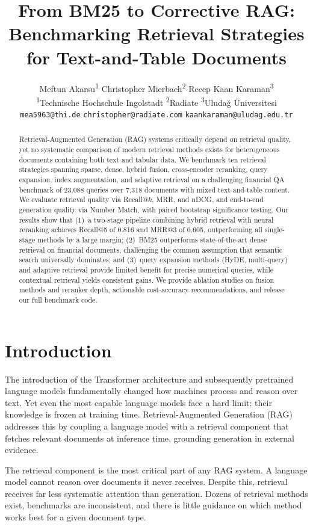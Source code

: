 \documentclass[11pt]{article}
\title{From BM25 to Corrective RAG: Benchmarking Retrieval Strategies for Text-and-Table Documents}
\author{
  Meftun Akarsu\textsuperscript{1} \quad
  Christopher Mierbach\textsuperscript{2} \quad
  Recep Kaan Karaman\textsuperscript{3} \\[6pt]
  \textsuperscript{1}Technische Hochschule Ingolstadt \quad
  \textsuperscript{2}Radiate \quad
  \textsuperscript{3}Uludağ Üniversitesi \\[2pt]
  \texttt{mea5963@thi.de} \quad
  \texttt{christopher@radiate.com} \quad
  \texttt{kaankaraman@uludag.edu.tr}
}
\begin{document}
\maketitle

\begin{abstract}
Retrieval-Augmented Generation (RAG) systems critically depend on retrieval quality, yet no systematic comparison of modern retrieval methods exists for heterogeneous documents containing both text and tabular data. We benchmark ten retrieval strategies spanning sparse, dense, hybrid fusion, cross-encoder reranking, query expansion, index augmentation, and adaptive retrieval on a challenging financial QA benchmark of 23,088 queries over 7,318 documents with mixed text-and-table content. We evaluate retrieval quality via Recall@$k$, MRR, and nDCG, and end-to-end generation quality via Number Match, with paired bootstrap significance testing. Our results show that (1)~a two-stage pipeline combining hybrid retrieval with neural reranking achieves Recall@5 of 0.816 and MRR@3 of 0.605, outperforming all single-stage methods by a large margin; (2)~BM25 outperforms state-of-the-art dense retrieval on financial documents, challenging the common assumption that semantic search universally dominates; and (3)~query expansion methods (HyDE, multi-query) and adaptive retrieval provide limited benefit for precise numerical queries, while contextual retrieval yields consistent gains. We provide ablation studies on fusion methods and reranker depth, actionable cost-accuracy recommendations, and release our full benchmark code.
\end{abstract}

\section{Introduction}
\label{sec:intro}

The introduction of the Transformer architecture \cite{vaswani2017attention} and subsequently pretrained language models \cite{devlin2019bert} fundamentally changed how machines process and reason over text. Yet even the most capable language models face a hard limit: their knowledge is frozen at training time. Retrieval-Augmented Generation (RAG) \cite{lewis2020rag} addresses this by coupling a language model with a retrieval component that fetches relevant documents at inference time, grounding generation in external evidence.

The retrieval component is the most critical part of any RAG system. A language model cannot reason over documents it never receives. Despite this, retrieval receives far less systematic attention than generation. Dozens of retrieval methods exist, benchmarks are inconsistent, and there is little guidance on which method works best for a given document type.
\end{document}
